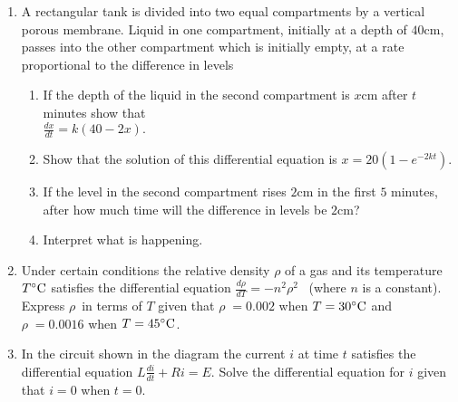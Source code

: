 \begin{enumerate}
\item A rectangular
tank is divided into two equal compartments by a vertical porous membrane.  Liquid in one compartment, initially
at a depth of $40 \mbox{cm}$, passes into the other compartment which is initially empty, at a rate proportional to the
difference in levels 


\begin{enumerate}
\item If the depth of the liquid in the second compartment is $x \mbox{cm}$ after $t$ minutes show that  \\\relax $\frac{d x}{d t} =k \left (40 -2 x\right )\text{.}$ 

\item Show that the solution of this differential equation is $x =20 \left (1 -e^{ -2 k t}\right )\text{.}$ 

\item If the level in the second compartment rises $2 \mbox{cm}$ in the first $5$ minutes, after how much time will the difference in levels be $2 \mbox{cm}$? 

\item Interpret what is happening. \end{enumerate}


\item Under certain conditions the relative density $\rho $ of a gas and its temperature $T \mbox{{\ensuremath{{}^\circ}}C}$ satisfies the differential equation $\frac{d \rho }{d T} = -n^{2} \rho ^{2}$  \ (where $n$ is a constant).  Express $\rho $\ in terms of $T$ given that $\rho \; =0.002$ when $T =30 \mbox{{\ensuremath{{}^\circ}}C}$ and $\rho \; =0.0016$ when $T =45 \mbox{{\ensuremath{{}^\circ}}C}$. 

\item In the circuit shown in the diagram the current $i$ at time $t$ satisfies the differential equation $L \frac{d i}{d t} +R i =E$.  Solve the differential equation for $i$ given that $i =0$ when $t =0.$ \end{enumerate}


\qquad \qquad \qquad \qquad \qquad
\setlength\fboxrule{0in}\setlength\fboxsep{0.2in}


 
\clearpage
